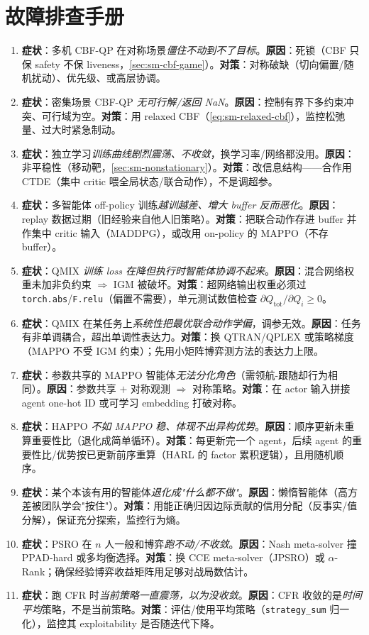 \section*{故障排查手册}
\begin{enumerate}
  \item \textbf{症状}：多机 CBF-QP 在对称场景\emph{僵住不动到不了目标}。\textbf{原因}：死锁（CBF 只保 safety 不保 liveness，\cref{sec:sm-cbf-game}）。\textbf{对策}：对称破缺（切向偏置/随机扰动）、优先级、或高层协调。
  \item \textbf{症状}：密集场景 CBF-QP \emph{无可行解/返回 NaN}。\textbf{原因}：控制有界下多约束冲突、可行域为空。\textbf{对策}：用 relaxed CBF（\cref{eq:sm-relaxed-cbf}），监控松弛量、过大时紧急制动。
  \item \textbf{症状}：独立学习\emph{训练曲线剧烈震荡、不收敛}，换学习率/网络都没用。\textbf{原因}：非平稳性（移动靶，\cref{sec:sm-nonstationary}）。\textbf{对策}：改信息结构——合作用 CTDE（集中 critic 喂全局状态/联合动作），不是调超参。
  \item \textbf{症状}：多智能体 off-policy 训练\emph{越训越差、增大 buffer 反而恶化}。\textbf{原因}：replay 数据过期（旧经验来自他人旧策略）。\textbf{对策}：把联合动作存进 buffer 并作集中 critic 输入（MADDPG），或改用 on-policy 的 MAPPO（不存 buffer）。
  \item \textbf{症状}：QMIX \emph{训练 loss 在降但执行时智能体协调不起来}。\textbf{原因}：混合网络权重未加非负约束 $\Rightarrow$ IGM 被破坏。\textbf{对策}：超网络输出权重必须过 \texttt{torch.abs}/\allowbreak\texttt{F.relu}（偏置不需要），单元测试数值检查 $\partial Q_{\text{tot}}/\partial Q_i\ge0$。
  \item \textbf{症状}：QMIX 在某任务上\emph{系统性把最优联合动作学偏}，调参无效。\textbf{原因}：任务有非单调耦合，超出单调性表达力。\textbf{对策}：换 QTRAN/QPLEX 或策略梯度（MAPPO 不受 IGM 约束）；先用小矩阵博弈测方法的表达力上限。
  \item \textbf{症状}：参数共享的 MAPPO 智能体\emph{无法分化角色}（需领航-跟随却行为相同）。\textbf{原因}：参数共享 $+$ 对称观测 $\Rightarrow$ 对称策略。\textbf{对策}：在 actor 输入拼接 agent one-hot ID 或可学习 embedding 打破对称。
  \item \textbf{症状}：HAPPO \emph{不如 MAPPO 稳、体现不出异构优势}。\textbf{原因}：顺序更新未重算重要性比（退化成简单循环）。\textbf{对策}：每更新完一个 agent，后续 agent 的重要性比/优势按已更新前序重算（HARL 的 factor 累积逻辑），且用随机顺序。
  \item \textbf{症状}：某个本该有用的智能体\emph{退化成"什么都不做"}。\textbf{原因}：懒惰智能体（高方差被团队学会"按住"）。\textbf{对策}：用能正确归因边际贡献的信用分配（反事实/值分解），保证充分探索，监控行为熵。
  \item \textbf{症状}：PSRO 在 $n$ 人一般和博弈\emph{跑不动/不收敛}。\textbf{原因}：Nash meta-solver 撞 PPAD-hard 或多均衡选择。\textbf{对策}：换 CCE meta-solver（JPSRO）或 $\alpha$-Rank；确保经验博弈收益矩阵用足够对战局数估计。
  \item \textbf{症状}：跑 CFR 时\emph{当前策略一直震荡，以为没收敛}。\textbf{原因}：CFR 收敛的是\emph{时间平均}策略，不是当前策略。\textbf{对策}：评估/使用平均策略（\texttt{strategy\_sum} 归一化），监控其 exploitability 是否随迭代下降。
\end{enumerate}
